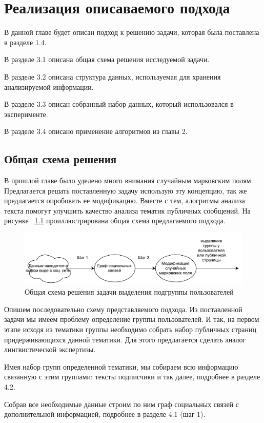 \documentclass[annotation,times,page4]{itmo-student-thesis}
\begin{document}
\chapter{Реализация описаваемого подхода}
В данной главе будет описан подход к решению задачи, которая была поставлена в разделе 1.4.

В разделе 3.1 описана общая схема решения исследуемой задачи. 

В разделе 3.2 описана структура данных, используемая для хранения анализируемой информации. 

В разделе 3.3 описан собранный набор данных, который использовался в эксперименте.

В разделе 3.4 описано применение алгоритмов из главы 2.

\section{Общая схема решения}
В прошлой главе было уделено много внимания случайным марковским полям. Предлагается решать поставленную задачу использую эту концепцию, так же предлагается опробовать ее модификацию. Вместе с тем, алогритмы анализа текста помогут улучшить качество анализа тематик публичных сообщений. На рисунке ~\ref{fig:plan} проиллюстрирована общая схема предлагаемого подхода.

\begin{figure}[!h]
\caption{Общая схема решения задачи выделения подгруппы пользователей}
\label{fig:plan}
\centering
\includegraphics[width=\textwidth]{figs/plan.pdf}
\end{figure}

Опишем последовательно схему представляемого подхода. Из поставленной задачи мы имеем проблему определение группы пользователей. И так, на первом этапе исходя из тематики группы необходимо собрать набор публичных страниц придерживающихся данной тематики. Для этого предлагается сделать аналог лингвистической экспертизы. 

Имея набор групп определенной тематики, мы собираем всю информацию связанную с этим группами: тексты подписчики и так далее, подробнее в разделе 4.2.

Собрав все необходимые данные строим по ним граф социальных связей с дополнительной информацией, подробнее в разделе 4.1 (шаг 1).
\end{document}
